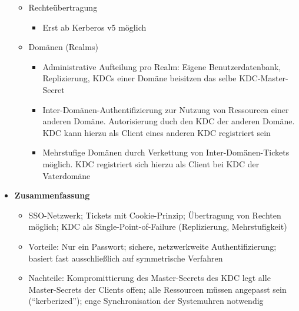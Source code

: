 \begin{itemize}
\begin{itemize}
\begin{itemize}
\begin{itemize}
			\end{itemize}
		\end{itemize}
		\item Rechteübertragung %
		\begin{itemize}
			\item Erst ab Kerberos v5 möglich
		\end{itemize}
		\item Domänen (Realms)
		\begin{itemize}
			\item Administrative Aufteilung pro Realm: Eigene Benutzerdatenbank, Replizierung, KDCs einer Domäne beisitzen das selbe KDC-Master-Secret
			\item Inter-Domänen-Authentifizierung zur Nutzung von Ressourcen einer anderen Domäne. Autorisierung duch den KDC der anderen Domäne. KDC kann hierzu als Client eines anderen KDC registriert sein
			\item Mehrstufige Domänen durch Verkettung von Inter-Domänen-Tickets möglich. KDC registriert sich hierzu als Client bei KDC der Vaterdomäne
		\end{itemize}
	\end{itemize}
	\item \textbf{Zusammenfassung}
	\begin{itemize}
		\item SSO-Netzwerk; Tickets mit Cookie-Prinzip; Übertragung von Rechten möglich; KDC als Single-Point-of-Failure (Replizierung, Mehrstufigkeit)
		\item Vorteile: Nur ein Passwort; sichere, netzwerkweite Authentifizierung; basiert fast ausschließlich auf symmetrische Verfahren
		\item Nachteile: Kompromittierung des Master-Secrets des KDC legt alle Master-Secrets der Clients offen; alle Ressourcen müssen angepasst sein ("`kerberized"'); enge Synchronisation der Systemuhren notwendig
	\end{itemize}
\end{itemize}



